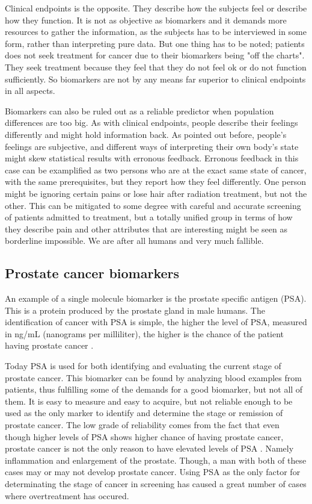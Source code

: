 Clinical endpoints is the opposite\cite{biomarker3}. They describe how the
subjects feel or describe how they function. It is not as objective as
biomarkers and it demands more resources to gather the information, as the
subjects has to be interviewed in some form, rather than interpreting pure data.
But one thing has to be noted; patients does not seek treatment for cancer due
to their biomarkers being "off the charts". They seek treatment because they
feel that they do not feel ok or do not function sufficiently. So biomarkers are
not by any means far superior to clinical endpoints in all aspects.

Biomarkers can also be ruled out as a reliable predictor when population
differences are too big\cite{biomarker3}. As with clinical endpoints, people
describe their feelings differently and might hold information back. As pointed
out before, people's feelings are subjective, and different ways of interpreting
their own body's state might skew statistical results with erronous feedback.
Erronous feedback in this case can be examplified as two persons who are at the
exact same state of cancer, with the same prerequisites, but they report how
they feel differently. One person might be ignoring certain pains or lose hair
after radiation treatment, but not the other. This can be mitigated to some
degree with careful and accurate screening of patients admitted to treatment,
but a totally unified group in terms of how they describe pain and other
attributes that are interesting might be seen as borderline impossible. We are
after all humans and very much fallible.

\subsection{Prostate cancer biomarkers}
An example of a single molecule biomarker is the prostate specific antigen
(PSA). This is a protein produced by the prostate gland in male humans. The
identification of cancer with PSA is simple, the higher the level of PSA,
measured in ng/mL (nanograms per milliliter), the higher is the chance of the
patient having prostate cancer \cite{cancerfacts}.

Today PSA is used for both identifying and evaluating the current stage of
prostate cancer. This biomarker can be found by analyzing blood examples from
patients, thus fulfilling some of the demands for a good biomarker, but not all
of them. It is easy to measure and easy to acquire, but not reliable enough to
be used as the only marker to identify and determine the stage or remission of
prostate cancer. The low grade of reliability comes from the fact that even
though higher levels of PSA shows higher chance of having prostate cancer,
prostate cancer is not the only reason to have elevated levels of PSA
\cite{cancerfacts}. Namely inflammation and enlargement of the prostate. Though,
a man with both of these cases may or may not develop prostate cancer. Using PSA
as the only factor for determinating the stage of cancer in screening has caused
a great number of cases where overtreatment has occured\cite{psa-overtreatment}.

